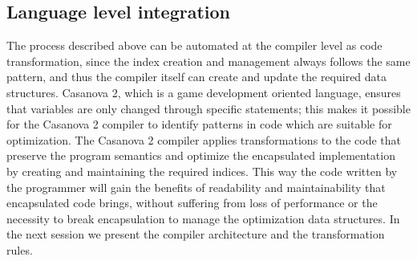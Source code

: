\subsection{Language level integration}

The process described above can be automated at the compiler level as code transformation, since the index creation and management always follows the same pattern, and thus the compiler itself can create and update the required data structures. Casanova 2, which is a game development oriented language, ensures that variables are only changed through specific statements; this makes it possible for the Casanova 2 compiler to identify patterns in code which are suitable for optimization. The Casanova 2 compiler applies transformations to the code that preserve the program semantics and optimize the encapsulated implementation by creating and maintaining the required indices. This way the code written by the programmer will gain the benefits of readability and maintainability that encapsulated code brings, without suffering from loss of performance or the necessity to break encapsulation to manage the optimization data structures. In the next session we present the compiler architecture and the transformation rules. 
